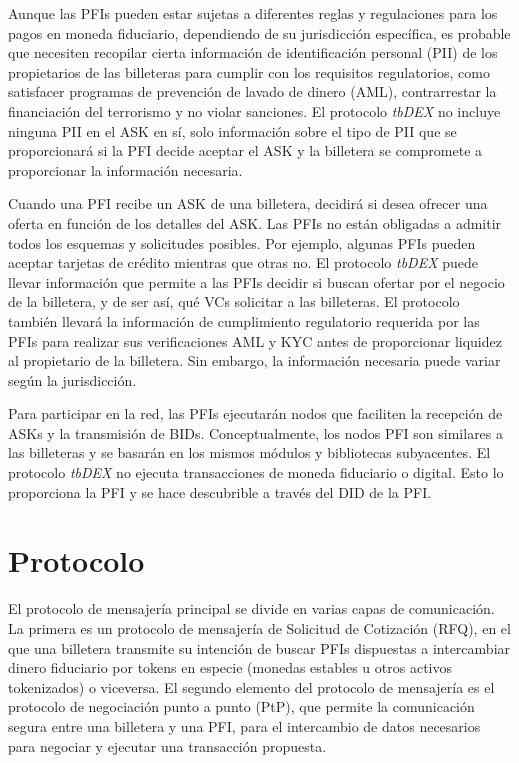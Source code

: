 \documentclass[11pt]{article}
\begin{document}
\vspace{1\baselineskip}
Aunque las PFIs pueden estar sujetas a diferentes reglas y regulaciones para los pagos en moneda fiduciario, dependiendo de su jurisdicción específica, es probable que necesiten recopilar cierta información de identificación personal (PII) de los propietarios de las billeteras para cumplir con los requisitos regulatorios, como satisfacer programas de prevención de lavado de dinero (AML), contrarrestar la financiación del terrorismo y no violar sanciones. El protocolo \textit{tbDEX} no incluye ninguna PII en el ASK en sí, solo información sobre el tipo de PII que se proporcionará si la PFI decide aceptar el ASK y la billetera se compromete a proporcionar la información necesaria.

\vspace{1\baselineskip}
Cuando una PFI recibe un ASK de una billetera, decidirá si desea ofrecer una oferta en función de los detalles del ASK. Las PFIs no están obligadas a admitir todos los esquemas y solicitudes posibles. Por ejemplo, algunas PFIs pueden aceptar tarjetas de crédito mientras que otras no. El protocolo \textit{tbDEX} puede llevar información que permite a las PFIs decidir si buscan ofertar por el negocio de la billetera, y de ser así, qué VCs solicitar a las billeteras. El protocolo también llevará la información de cumplimiento regulatorio requerida por las PFIs para realizar sus verificaciones AML y KYC antes de proporcionar liquidez al propietario de la billetera. Sin embargo, la información necesaria puede variar según la jurisdicción.

\vspace{1\baselineskip}
Para participar en la red, las PFIs ejecutarán nodos que faciliten la recepción de ASKs y la transmisión de BIDs. Conceptualmente, los nodos PFI son similares a las billeteras y se basarán en los mismos módulos y bibliotecas subyacentes. El protocolo \textit{tbDEX} no ejecuta transacciones de moneda fiduciario o digital. Esto lo proporciona la PFI y se hace descubrible a través del DID de la PFI.

\vspace{1\baselineskip}
\section{Protocolo}

\vspace{1\baselineskip}
El protocolo de mensajería principal se divide en varias capas de comunicación. La primera es un protocolo de mensajería de Solicitud de Cotización (RFQ), en el que una billetera transmite su intención de buscar PFIs dispuestas a intercambiar dinero fiduciario por tokens en especie (monedas estables u otros activos tokenizados) o viceversa. El segundo elemento del protocolo de mensajería es el protocolo de negociación punto a punto (PtP), que permite la comunicación segura entre una billetera y una PFI, para el intercambio de datos necesarios para negociar y ejecutar una transacción propuesta.
\end{document}
